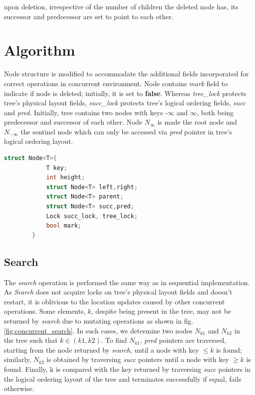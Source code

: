 \documentclass[MTech]{iitmdiss}
\begin{document}
\indent upon deletion, irrespective of the number of children the deleted node has, its successor and predecessor are set to point to each other.  

\section{Algorithm}
Node structure is modified to accommodate the additional fields incorporated for    correct operations in concurrent environment. Node contains \textit{mark} field to indicate if node is deleted; initially, it is set to \textbf{false}. Whereas \textit{tree\_lock} protects tree's physical layout fields, \textit{succ\_lock} protects tree's logical ordering fields, \textit{succ} and \textit{pred}. Initially, tree contains two nodes with keys -$\infty$ and $\infty$, both being predecessor and successor of each other. Node $N_{\infty}$ is made the root node and $N_{-\infty}$ the sentinel node which can only be accessed via \textit{pred} pointer in tree's logical ordering layout. 

\begin{lstlisting}[language=c++]
        struct Node<T>{
            T key;
            int height;
            struct Node<T> left,right;
            struct Node<T> parent;
            struct Node<T> succ,pred;
            Lock succ_lock, tree_lock;
            bool mark;                
        }
\end{lstlisting}

\subsection{Search} 
The \textit{search} operation is performed the same way as in sequential implementation. As \textit{Search} does not acquire locks on tree's physical layout fields and doesn't restart, it is oblivious to the location updates caused by other concurrent operations. Some elements, $k$, despite being present in the tree, may not be returned by \textit{search} due to mutating operations as shown in fig. \ref{fig:concurrent_search}. In such cases, we determine two nodes $N_{k1}$ and $N_{k2}$ in the tree such that $k \in (k1, k2)$. To find $N_{k1}$,    \textit{pred} pointers are traversed, starting from the node returned by \textit{search}, until a node with key $\leq k$ is found; similarly, $N_{k2}$ is obtained by traversing \textit{succ} pointers until a node with key $\geq k$ is found. Finally, k is compared with the key returned by traversing \textit{succ} pointers in the logical ordering layout of the tree and terminates successfully if equal, fails otherwise.
\end{document}
